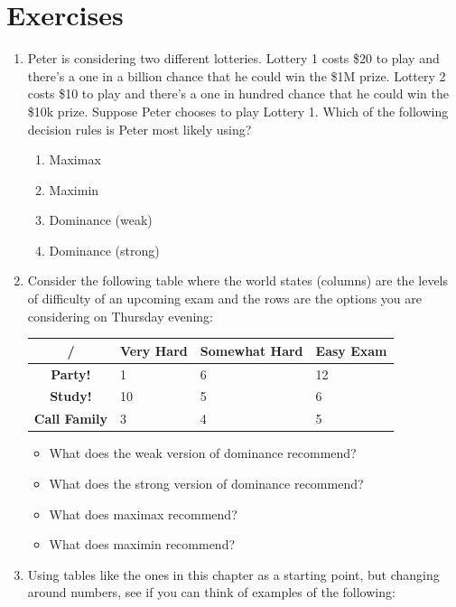 \documentclass[]{tufte-book}
\providecommand{\tightlist}{%
  \setlength{\itemsep}{0pt}\setlength{\parskip}{0pt}}
\begin{document}
\hypertarget{exercises-1}{%
\section*{Exercises}\label{exercises-1}}

\begin{enumerate}
\def\labelenumi{\arabic{enumi}.}
\item
  Peter is considering two different lotteries. Lottery 1 costs \$20 to play and there's a one in a billion chance that he could win the \$1M prize. Lottery 2 costs \$10 to play and there's a one in hundred chance that he could win the \$10k prize. Suppose Peter chooses to play Lottery 1. Which of the following decision rules is Peter most likely using?

  \begin{enumerate}
  \def\labelenumii{\alph{enumii}.}
  \tightlist
  \item
    Maximax
  \item
    Maximin
  \item
    Dominance (weak)
  \item
    Dominance (strong)
  \end{enumerate}
\item
  Consider the following table where the world states (columns) are the levels of difficulty of an upcoming exam and the rows are the options you are considering on Thursday evening:

  \begin{longtable}[]{@{}clll@{}}
  \toprule
  / & Very Hard & Somewhat Hard & Easy Exam\tabularnewline
  \midrule
  \endhead
  \textbf{Party!} & 1 & 6 & 12\tabularnewline
  \textbf{Study!} & 10 & 5 & 6\tabularnewline
  \textbf{Call Family} & 3 & 4 & 5\tabularnewline
  \bottomrule
  \end{longtable}

  \begin{itemize}
  \tightlist
  \item
    What does the weak version of dominance recommend?
  \item
    What does the strong version of dominance recommend?
  \item
    What does maximax recommend?
  \item
    What does maximin recommend?
  \end{itemize}
\item
  Using tables like the ones in this chapter as a starting point, but changing around numbers, see if you can think of examples of the following:


\end{enumerate}
\end{document}

